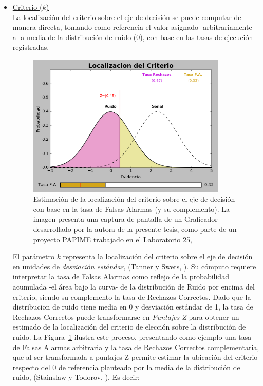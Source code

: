 \begin{itemize}
\item \underline{Criterio ($k$)}\\

La localización del criterio sobre el eje de decisión se puede computar de manera directa, tomando como referencia el valor asignado -arbitrariamente- a la media de la distribución de ruido ($0$), con base en las tasas de ejecución registradas. \\

\begin{figure}[th]
\centering
\includegraphics[width=0.90\textwidth]{Figures/Graficador_Criterio} 
\caption[Estimación del criterio con base en las Falsas Alarmas]{Estimación de la localización del criterio sobre el eje de decisión con base en la tasa de Falsas Alarmas (y su complemento). La imagen presenta una captura de pantalla de un Graficador desarrollado por la autora de la presente tesis, como parte de un proyecto PAPIME trabajado en el Laboratorio 25, \citep{PAPIME}}
\label{fig:Graf_Criterio}
\end{figure}

El parámetro $k$ representa la localización del criterio sobre el eje de decisión en unidades de \textit{desviación estándar}, (Tanner y Swets, \citeyear{Tanner1954}). Su cómputo requiere interpretar la tasa de Falsas Alarmas como reflejo de la probabilidad acumulada -el área bajo la curva- de la distribución de Ruido por encima del criterio, siendo su complemento la tasa de Rechazos Correctos. Dado que la distribucion de ruido tiene media en 0 y desviación estándar de 1, la tasa de Rechazos Correctos puede transformarse en \textit{Puntajes Z} para obtener un estimado de la localización del criterio de elección sobre la distribución de ruido. La Figura~\ref{fig:Graf_Criterio} ilustra este proceso, presentando como ejemplo una tasa de Falsas Alarmas arbitraria y la tasa de Rechazos Correctos complementaria, que al ser transformada a puntajes Z permite estimar la ubicación del criterio respecto del 0 de referencia planteado por la media de la distribución de ruido, (Stainslaw y Todorov, \citeyear{Stainslaw1999}). Es decir:\\


\end{itemize}
